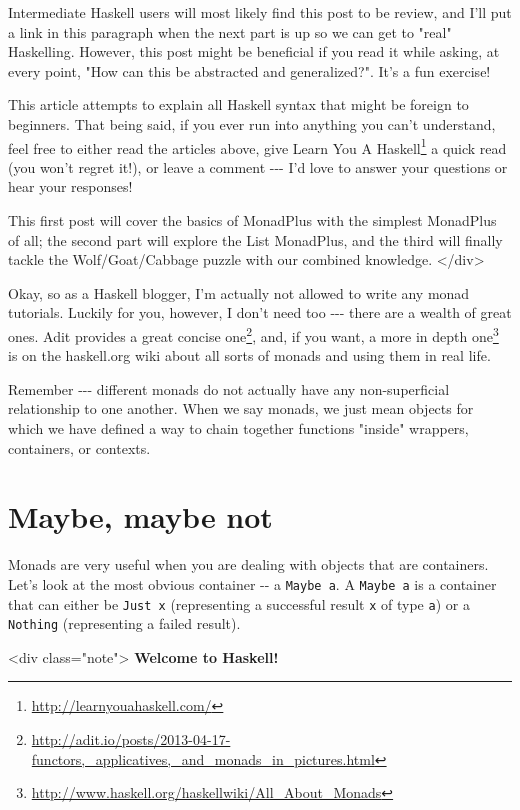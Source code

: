 \documentclass[]{article}
\renewcommand{\href}[2]{#2\footnote{\url{#1}}}
\begin{document}
Intermediate Haskell users will most likely find this post to be review, and
I'll put a link in this paragraph when the next part is up so we can get to
"real" Haskelling. However, this post might be beneficial if you read it while
asking, at every point, "How can this be abstracted and generalized?". It's a
fun exercise!

This article attempts to explain all Haskell syntax that might be foreign to
beginners. That being said, if you ever run into anything you can't understand,
feel free to either read the articles above, give
\href{http://learnyouahaskell.com/}{Learn You A Haskell} a quick read (you won't
regret it!), or leave a comment -\/-\/- I'd love to answer your questions or
hear your responses!

This first post will cover the basics of MonadPlus with the simplest MonadPlus
of all; the second part will explore the List MonadPlus, and the third will
finally tackle the Wolf/Goat/Cabbage puzzle with our combined knowledge.
\textless{}/div\textgreater{}

Okay, so as a Haskell blogger, I'm actually not allowed to write any monad
tutorials. Luckily for you, however, I don't need too -\/-\/- there are a wealth
of great ones.
\href{http://adit.io/posts/2013-04-17-functors,_applicatives,_and_monads_in_pictures.html}{Adit
provides a great concise one}, and, if you want,
\href{http://www.haskell.org/haskellwiki/All_About_Monads}{a more in depth one}
is on the haskell.org wiki about all sorts of monads and using them in real
life.

Remember -\/-\/- different monads do not actually have any non-superficial
relationship to one another. When we say monads, we just mean objects for which
we have defined a way to chain together functions "inside" wrappers, containers,
or contexts.

\section{Maybe, maybe not}

Monads are very useful when you are dealing with objects that are containers.
Let's look at the most obvious container -\/- a \texttt{Maybe\ a}. A
\texttt{Maybe\ a} is a container that can either be \texttt{Just\ x}
(representing a successful result \texttt{x} of type \texttt{a}) or a
\texttt{Nothing} (representing a failed result).

\textless{}div class="note"\textgreater{} \textbf{Welcome to Haskell!}
\end{document}
